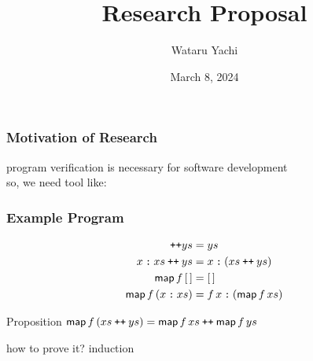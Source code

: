 \documentclass[12pt,aspectratio=169]{beamer}
\title{ Research Proposal }
\author{Wataru Yachi}
\institute{JAIST}
\date{March 8, 2024}
\newcommand{\m}[1]{\mathsf{#1}}
\newcommand\catenate{\mathbin{\text{\ttfamily\upshape ++}}}
\newcommand\cons{\mathbin{\text{\ttfamily\upshape :}}}
\begin{document}
\maketitle

\begin{frame}
    \frametitle{Motivation of Research}
    program verification is necessary for software development\\
    so, we need tool like:
    \begin{figure}
        \centering
    \end{figure}
\end{frame}

\newcommand{\map}{\m{map}}
\newcommand{\nil}{[\,]}

\begin{frame}
    \frametitle{Example Program}
    \begin{example}
            \setlength{\abovedisplayskip}{1pt}
            \setlength{\belowdisplayskip}{1pt}
        \begin{align*}
            \nil \catenate ys &= ys\\
            x\cons xs \catenate ys &= x \cons (xs \catenate ys)\\
            \map\,f\,\nil &= \nil\\
            \map\,f\,(x\cons xs) &= f\,x \cons (\map\,f\,xs)\\
        \end{align*}
        \vspace{-20pt}
    \begin{block}{Proposition}
        $\m{map}\,f\,(xs \catenate ys) = \m{map} \, f \, xs \catenate \m{map}\,f\,ys$
    \end{block}
        how to prove it? \quad \alert{induction}
    \end{example}
\end{frame}
\end{document}
